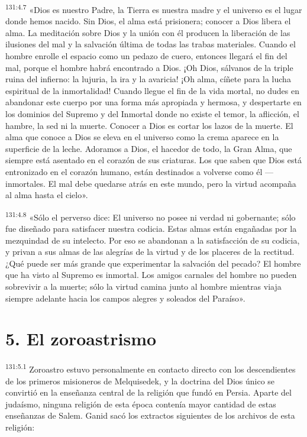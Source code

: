 \par
\textsuperscript{131:4.7} «Dios es nuestro Padre, la Tierra es nuestra madre y el universo es el lugar donde hemos nacido. Sin Dios, el alma está prisionera; conocer a Dios libera el alma. La meditación sobre Dios y la unión con él producen la liberación de las ilusiones del mal y la salvación última de todas las trabas materiales. Cuando el hombre enrolle el espacio como un pedazo de cuero, entonces llegará el fin del mal, porque el hombre habrá encontrado a Dios. ¡Oh Dios, sálvanos de la triple ruina del infierno: la lujuria, la ira y la avaricia! ¡Oh alma, cíñete para la lucha espiritual de la inmortalidad! Cuando llegue el fin de la vida mortal, no dudes en abandonar este cuerpo por una forma más apropiada y hermosa, y despertarte en los dominios del Supremo y del Inmortal donde no existe el temor, la aflicción, el hambre, la sed ni la muerte. Conocer a Dios es cortar los lazos de la muerte. El alma que conoce a Dios se eleva en el universo como la crema aparece en la superficie de la leche. Adoramos a Dios, el hacedor de todo, la Gran Alma, que siempre está asentado en el corazón de sus criaturas. Los que saben que Dios está entronizado en el corazón humano, están destinados a volverse como él ---inmortales. El mal debe quedarse atrás en este mundo, pero la virtud acompaña al alma hasta el cielo».

\par
\textsuperscript{131:4.8} «Sólo el perverso dice: El universo no posee ni verdad ni gobernante; sólo fue diseñado para satisfacer nuestra codicia. Estas almas están engañadas por la mezquindad de su intelecto. Por eso se abandonan a la satisfacción de su codicia, y privan a sus almas de las alegrías de la virtud y de los placeres de la rectitud. ¿Qué puede ser más grande que experimentar la salvación del pecado? El hombre que ha visto al Supremo es inmortal. Los amigos carnales del hombre no pueden sobrevivir a la muerte; sólo la virtud camina junto al hombre mientras viaja siempre adelante hacia los campos alegres y soleados del Paraíso».

\section*{5. El zoroastrismo}
\par
\textsuperscript{131:5.1} Zoroastro estuvo personalmente en contacto directo con los descendientes de los primeros misioneros de Melquisedek, y la doctrina del Dios único se convirtió en la enseñanza central de la religión que fundó en Persia. Aparte del judaísmo, ninguna religión de esta época contenía mayor cantidad de estas enseñanzas de Salem. Ganid sacó los extractos siguientes de los archivos de esta religión:


